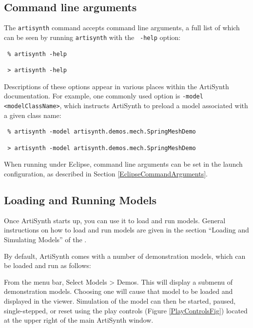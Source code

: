 \subsection{Command line arguments}
\label{CommandLineArguments}

The {\tt artisynth} command accepts command line arguments, a full
list of which can be seen by running {\tt artisynth} with the {\tt
-help} option:
\ifWindows
\begin{verbatim}
 % artisynth -help
\end{verbatim}
\else %
\begin{verbatim}
 > artisynth -help
\end{verbatim}
\fi %
Descriptions of these options appear in various places within the
ArtiSynth documentation. For example, one commonly used option is
{\tt -model <modelClassName>}, which instructs ArtiSynth to preload a
model associated with a given class name:
\ifWindows
\begin{verbatim}
 % artisynth -model artisynth.demos.mech.SpringMeshDemo
\end{verbatim}
\else %
\begin{verbatim}
 > artisynth -model artisynth.demos.mech.SpringMeshDemo
\end{verbatim}
\fi %

When running under Eclipse, command line arguments can be set in the
launch configuration, as described in
Section \ref{EclipseCommandArguments}.

\subsection{Loading and Running Models}

Once ArtiSynth starts up, you can use it to load and run
models. General instructions on how to load and run models are given
in the section ``Loading and Simulating Models'' of the
. 

By default, ArtiSynth comes with a number of demonstration models,
which can be loaded and run as follows:

From the menu bar, Select {\sf Models > Demos}.  This will display a
submenu of demonstration models. Choosing one will cause that model to
be loaded and displayed in the viewer.  Simulation of the model can
then be started, paused, single-stepped, or reset using the play
controls (Figure \ref{PlayControlsFig}) located at the upper right of
the main ArtiSynth window.

